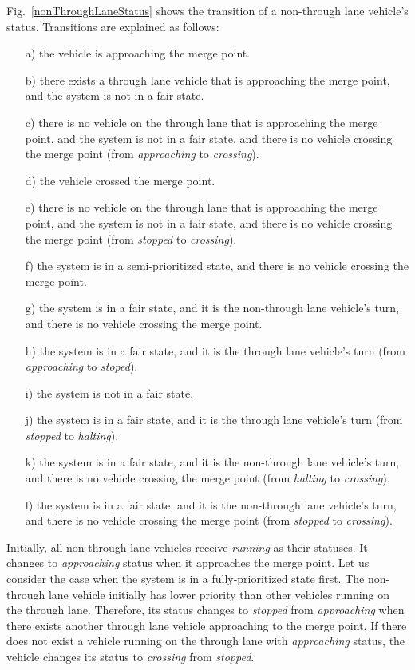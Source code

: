 \documentclass[10pt, conference, compsocconf]{IEEEtran}
\begin{document}
Fig.~\ref{nonThroughLaneStatus} shows the transition of a non-through lane vehicle's status.
Transitions are explained as follows:
\begin{itemize}
    \item[a)] the vehicle is approaching the merge point. %
    \item[b)] there exists a through lane vehicle that is approaching the merge point, and the system is not in a fair state. %
    \item[c)] there is no vehicle on the through lane that is approaching the merge point, and the system is not in a fair state, and there is no vehicle crossing the merge point (from \textit{approaching} to \textit{crossing}). %
    \item[d)] the vehicle crossed the merge point. %
    \item[e)] there is no vehicle on the through lane that is approaching the merge point, and the system is not in a fair state, and there is no vehicle crossing the merge point (from \textit{stopped} to \textit{crossing}). %
    \item[f)] the system is in a semi-prioritized state, and there is no vehicle crossing the merge point. %
    \item[g)] the system is in a fair state, and it is the non-through lane vehicle's turn, and there is no vehicle crossing the merge point. %
    \item[h)] the system is in a fair state, and it is the through lane vehicle's turn (from \textit{approaching} to \textit{stoped}). %
    \item[i)] the system is not in a fair state. %
    \item[j)] the system is in a fair state, and it is the through lane vehicle's turn (from \textit{stopped} to \textit{halting}). %
    \item[k)] the system is in a fair state, and it is the non-through lane vehicle's turn, and there is no vehicle crossing the merge point (from \textit{halting} to \textit{crossing}). %
    \item[l)] the system is in a fair state, and it is the non-through lane vehicle's turn, and there is no vehicle crossing the merge point (from \textit{stopped} to \textit{crossing}). %
\end{itemize}

Initially, all non-through lane vehicles receive \textit{running} as their statuses.
It changes to \textit{approaching} status when it approaches the merge point.
Let us consider the case when the system is in a fully-prioritized state first.
The non-through lane vehicle initially has lower priority than other vehicles running on the through lane.
Therefore, its status changes to \textit{stopped} from \textit{approaching} when there exists another through lane vehicle approaching to the merge point.
If there does not exist a vehicle running on the through lane with \textit{approaching} status, the vehicle changes its status to \textit{crossing} from \textit{stopped}.
\end{document}
